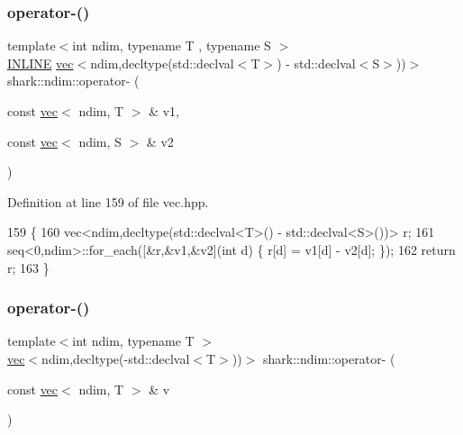 \subsubsection{\texorpdfstring{operator-\/()}{operator-()}\hspace{0.1cm}{\footnotesize\ttfamily [2/8]}}
{\footnotesize\ttfamily template$<$int ndim, typename T , typename S $>$ \\
\hyperlink{common_8hpp_a2eb6f9e0395b47b8d5e3eeae4fe0c116}{I\+N\+L\+I\+NE} \hyperlink{structshark_1_1ndim_1_1vec}{vec}$<$ndim,decltype(std\+::declval$<$T$>$) -\/ std\+::declval$<$S$>$))$>$ shark\+::ndim\+::operator-\/ (\begin{DoxyParamCaption}\item[{const \hyperlink{structshark_1_1ndim_1_1vec}{vec}$<$ ndim, T $>$ \&}]{v1,  }\item[{const \hyperlink{structshark_1_1ndim_1_1vec}{vec}$<$ ndim, S $>$ \&}]{v2 }\end{DoxyParamCaption})\hspace{0.3cm}{\ttfamily [inline]}}



Definition at line 159 of file vec.\+hpp.


\begin{DoxyCode}
159                                                                                                            
                        \{
160             vec<ndim,decltype(std::declval<T>() - std::declval<S>())> r;
161             seq<0,ndim>::for\_each([&r,&v1,&v2](\textcolor{keywordtype}{int} d) \{ r[d] = v1[d] - v2[d]; \});
162             \textcolor{keywordflow}{return} r;
163         \}
\end{DoxyCode}
\hypertarget{namespaceshark_1_1ndim_a7be1c7528e2acd409211d050314c478b}{}\label{namespaceshark_1_1ndim_a7be1c7528e2acd409211d050314c478b} 
\subsubsection{\texorpdfstring{operator-\/()}{operator-()}\hspace{0.1cm}{\footnotesize\ttfamily [3/8]}}
{\footnotesize\ttfamily template$<$int ndim, typename T $>$ \\
\hyperlink{structshark_1_1ndim_1_1vec}{vec}$<$ndim,decltype(-\/std\+::declval$<$T$>$))$>$ shark\+::ndim\+::operator-\/ (\begin{DoxyParamCaption}\item[{const \hyperlink{structshark_1_1ndim_1_1vec}{vec}$<$ ndim, T $>$ \&}]{v }\end{DoxyParamCaption})\hspace{0.3cm}{\ttfamily [inline]}}



